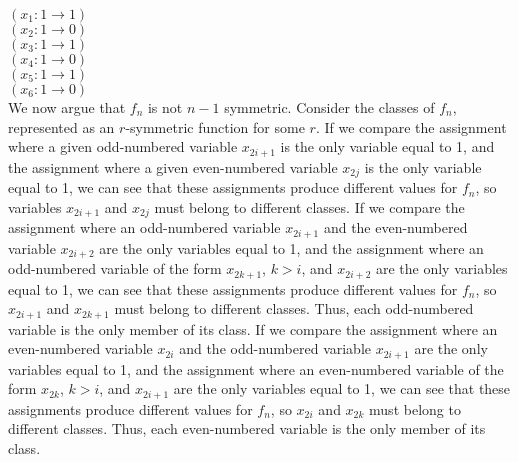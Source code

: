 \noindent
$(x_1: 1 \rightarrow 1 )$ \\
$(x_2: 1 \rightarrow 0 )$ \\
$(x_3: 1 \rightarrow 1 )$ \\
$(x_4: 1 \rightarrow 0 )$ \\
$(x_5: 1 \rightarrow 1 )$ \\
$(x_6: 1 \rightarrow 0 )$ \\

We now argue that $f_n$ is not $n-1$ symmetric.
Consider the classes of $f_n$, represented as an $r$-symmetric function for some $r$.
If we compare the assignment where a given odd-numbered variable $x_{2i+1}$ is the only variable equal to 1,
and the assignment where a given even-numbered variable $x_{2j}$ is the only variable equal to 1,
we can see that these assignments produce different values for $f_n$,
so variables $x_{2i+1}$ and $x_{2j}$ must belong to different classes.
If we compare the assignment where an odd-numbered variable $x_{2i+1}$  
and the even-numbered variable $x_{2i+2}$ 
are the only variables equal to 1,
and the assignment where an odd-numbered variable of the form $x_{2k+1}$, $k >i$,
and $x_{2i+2}$  are the only variables equal to 1,
we can see that these assignments produce different values for $f_n$,
so $x_{2i+1}$ and $x_{2k+1}$ must belong to different classes.
Thus, each odd-numbered variable is the only member of its class.
If we compare the assignment where an even-numbered variable $x_{2i}$  
and the odd-numbered variable $x_{2i+1}$ 
are the only variables equal to 1,
and the assignment where an even-numbered variable of the form $x_{2k}$, $k >i$,
and $x_{2i+1}$  are the only variables equal to 1,
we can see that these assignments produce different values for $f_n$,
so $x_{2i}$ and $x_{2k}$ must belong to different classes.
Thus, each even-numbered variable is the only member of its class.
\QED

\fi



